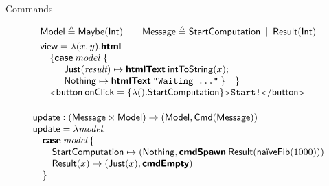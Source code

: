 \documentclass[11.5pt, aspectratio=169]{beamer}
\begin{document}

\begin{frame}{Commands}

  {\small
  \[
\bl
\mkwd{Model} \defeq \mkwd{Maybe}(\intty) \qquad
\mkwd{Message} \defeq \mkwd{StartComputation} \midspace \mkwd{Result}(\intty) \vspace{0.35em} \\
%
%
\mkwd{view} = \lambda (x, y) . \calcwd{html} \\
\quad \{
  \caseofone{model} \{ \\
  \qquad
  {\begin{array}[t]{l}
     \mkwd{Just}(\textit{result}) \mapsto \htmltext{\intstr{x}}; \\
     \mkwd{Nothing} \mapsto \htmltext{\textnode{"Waiting \ldots"}} \:
   \}
  \quad \} \\
  \end{array}} \\
  \quad \htmltag{button}{\attribute{onClick} = \antiquote{\lambda () .
  \mkwd{StartComputation}} }{\textnode{Start!}} \vspace{0.75em} \\
\el
\]%
\[
  \begin{array}{l}
\mathsf{update} : (\mathsf{Message} \times \mathsf{Model}) \to (\mathsf{Model},
\mathsf{Cmd}(\mathsf{Message}))\\
\mathsf{update} = \lambda \textit{model} . \\
\quad \textbf{\textsf{case}} \: \textit{model} \: \{ \\
  \qquad \mathsf{StartComputation} \mapsto (\mathsf{Nothing},
  \textbf{\textsf{cmdSpawn}} \: \mathsf{Result}(\textsf{na\"iveFib}(1000))) \\
  \qquad \mathsf{Result}(x) \mapsto (\mathsf{Just}(x), \textbf{\textsf{cmdEmpty}}) \\
  \quad \}
\end{array}
\]%
}
\end{frame}
\end{document}
